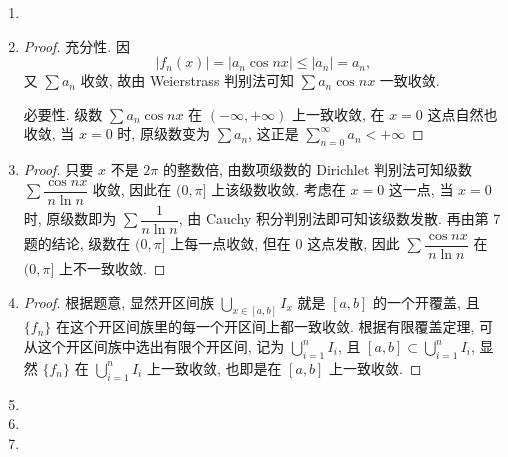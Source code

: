 \begin{enumerate}
\begin{proof}
            再考虑 $\sum{u_n(x)}$ 是否存在优级数, 用反证法. 假设 $\sum{u_n(x)}$ 存在优级数, 则有
            \[
                u_n(x) \leq a_n    
            \]
            对一切 $x \in [0, 1]$ 都成立. 现取 $x = \frac{1}{n}$, 即
            \[
                \frac1n = u_n\left(\frac1n\right) \leq a_n.    
            \]
            由正项级数的比较判别法可知 $\sum{a_n}$ 发散, 与优级数的定义相悖, 因此级数 $\sum{u_n(x)}$ 不存在优级数. 
        \end{proof}
    \item %
    \item %
        \begin{proof}
            充分性. 因
            \[
                |f_n(x)| = |a_n\cos{nx}| \leq |a_n| = a_n,    
            \]
            又 $\sum{a_n}$ 收敛, 故由 Weierstrass 判别法可知 $\sum{a_n\cos{nx}}$ 一致收敛.

            必要性. 级数 $\sum{a_n\cos{nx}}$ 在 $(-\infty, +\infty)$ 上一致收敛, 在 $x = 0$ 这点自然也收敛, 当 $x = 0$ 时, 原级数变为 $\sum{a_n}$, 这正是 $\sum\limits_{n=0}^\infty{a_n} < +\infty$ 
        \end{proof}
    \item %
        \begin{proof}
            只要 $x$ 不是 $2\pi$ 的整数倍, 由数项级数的 Dirichlet 判别法可知级数 $\sum\dfrac{\cos{nx}}{n\ln{n}}$ 收敛, 因此在 $(0, \pi]$ 上该级数收敛.
            考虑在 $x = 0$ 这一点, 当 $x = 0$ 时, 原级数即为 $\sum\dfrac{1}{n\ln{n}}$, 由 Cauchy 积分判别法即可知该级数发散. 再由第 7 题的结论, 级数在 $(0, \pi]$ 上每一点收敛,
            但在 $0$ 这点发散, 因此 $\sum\dfrac{\cos{nx}}{n\ln{n}}$ 在 $(0, \pi]$ 上不一致收敛.
        \end{proof}
    \item %
        \begin{proof}
            根据题意, 显然开区间族 $\bigcup\limits_{x\in[a,b]}I_x$ 就是 $[a, b]$ 的一个开覆盖, 且 $\{f_n\}$ 在这个开区间族里的每一个开区间上都一致收敛.
            根据有限覆盖定理, 可从这个开区间族中选出有限个开区间, 记为 $\bigcup\limits_{i=1}^nI_i$, 且 $[a, b] \subset \bigcup\limits_{i=1}^nI_i$,
            显然 $\{f_n\}$ 在 $\bigcup\limits_{i=1}^nI_i$ 上一致收敛, 也即是在 $[a, b]$ 上一致收敛.
        \end{proof}
    \item %
    \item %
    \item %
\end{enumerate}
% 
